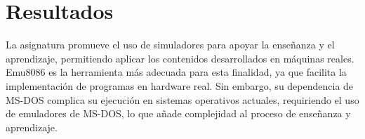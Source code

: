 \documentclass[12pt,oneside]{templates/unerthesis}
\begin{document}
\begin{table}[!h]
\centering
\caption{\label{tab:tabla-comparativa-criterios}Comparativa según criterios de evaluación preestablecidos}
\centering
{}
\end{table}

\hypertarget{resultados}{%
\section{Resultados}\label{resultados}}

La asignatura promueve el uso de simuladores para apoyar la enseñanza y el aprendizaje, permitiendo aplicar los contenidos desarrollados en máquinas reales. Emu8086 es la herramienta más adecuada para esta finalidad, ya que facilita la implementación de programas en hardware real. Sin embargo, su dependencia de MS-DOS complica su ejecución en sistemas operativos actuales, requiriendo el uso de emuladores de MS-DOS, lo que añade complejidad al proceso de enseñanza y aprendizaje.
\end{document}
